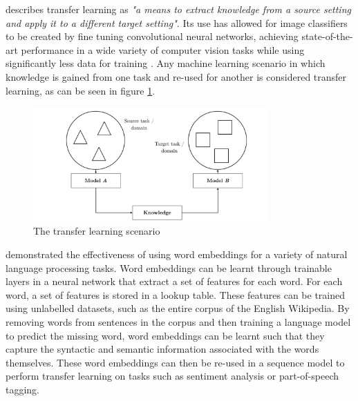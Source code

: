 \cite{ruder2019state} describes transfer learning as \textit{"a means to extract knowledge from a source setting and apply it to a different target setting"}. Its use has allowed for image classifiers to be created by fine tuning convolutional neural networks, achieving state-of-the-art performance in a wide variety of computer vision tasks while using significantly less data for training \parencite{sharif2014cnn}. Any machine learning scenario in which knowledge is gained from one task and re-used for another is considered transfer learning, as can be seen in figure \ref{fig:transfer-scenario}.

\begin{figure}[H]
\centering
\includegraphics[width=0.8\textwidth]{Figures/2_transfer-learning-scenario.png}
\decoRule
\caption[Transfer Learning Scenario]{The transfer learning scenario \parencite{ruder2019state}}
\label{fig:transfer-scenario}
\end{figure}

\cite{collobert2011natural} demonstrated the effectiveness of using word embeddings for a variety of natural language processing tasks. Word embeddings can be learnt through trainable layers in a neural network that extract a set of features for each word. For each word, a set of features is stored in a lookup table. These features can be trained using unlabelled datasets, such as the entire corpus of the English Wikipedia. By removing words from sentences in the corpus and then training a language model to predict the missing word, word embeddings can be learnt such that they capture the syntactic and semantic information associated with the words themselves. These word embeddings can then be re-used in a sequence model to perform transfer learning on tasks such as sentiment analysis or part-of-speech tagging.